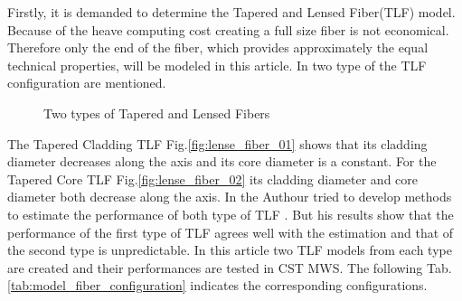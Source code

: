 

Firstly, it is demanded to determine the Tapered and Lensed Fiber(TLF) model. Because of the heave computing cost creating a full size fiber is not economical. Therefore only the end of the fiber, which provides approximately the equal technical properties, will be modeled in this article. In \cite{TLF_analysis} \cite{TLF_mode_transforming} two type of the TLF configuration are mentioned. 


\begin{figure}
\centering
{}
\hfill
{}
\label{fig:two_TLF}
\caption{Two types of Tapered and Lensed Fibers}
\end{figure}

The Tapered Cladding TLF Fig.\ref{fig:lense_fiber_01} shows that its cladding diameter decreases along the axis and its core diameter is a constant. For the Tapered Core TLF Fig.\ref{fig:lense_fiber_02} its cladding diameter and core diameter both decrease along the axis. In \cite{TLF_mode_transforming} the Authour tried to develop methods to estimate the performance of both type of TLF .  But his results show that the performance of the first type of TLF agrees well with the estimation and that of the second type is unpredictable. 
In this article two TLF models from each type are created and their performances are tested in CST MWS. The following Tab.\ref{tab:model_fiber_configuration} indicates the corresponding configurations.


